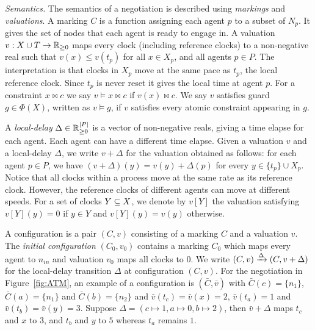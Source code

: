 \smallskip
\noindent \emph{Semantics.} The semantics of a negotiation is described using \emph{markings} and \emph{valuations}.  A marking $C$ is a function assigning each agent $p$ to a subset of $N_p$. It gives the set of nodes that each agent is ready to engage in. A valuation $v: X \cup T \to \mathbb{R}_{\ge 0}$ maps every clock (including reference clocks) to a non-negative real such that $v(x) \le v(t_p)$ for all $x \in X_p$, and all agents $p \in P$. The interpretation is that clocks in $X_p$ move at the same pace as $t_p$, the local reference clock. Since $t_p$ is never reset it gives the local time at agent $p$. For a constraint $x \bowtie c$ we say $v \models x \bowtie c$ if $v(x) \bowtie c$. We say $v$ satisfies guard $g \in \Phi(X)$, written as $v \models g$, if $v$ satisfies every atomic constraint appearing in $g$.

A \emph{local-delay} $\Delta \in \mathbb{R}_{\ge 0}^{|P|}$ is a vector of non-negative reals, giving a time elapse for each agent. Each agent can have a different time elapse.  Given a valuation $v$ and a local-delay $\Delta$, we write $v + \Delta$ for the valuation obtained as follows: for each agent $p \in P$, we have $(v + \Delta)(y) = v(y) + \Delta(p)$ for every $y \in \{t_p\} \cup X_p$. Notice that all clocks within a process move at the same rate as its reference clock. However, the reference clocks of different agents can move at different speeds. For a set of clocks $Y \subseteq X$, we denote by $v[Y]$ the valuation satisfying $v[Y](y) = 0$ if $y \in Y$ and $v[Y](y) = v(y)$ otherwise. 

A configuration is a pair $(C, v)$ consisting of a marking $C$ and a valuation $v$. The \emph{initial configuration} $(C_0, v_0)$ contains a marking $C_0$ which maps every agent to $n_{in}$ and valuation $v_0$ maps all clocks to $0$. We write $(C, v) \xrightarrow{\Delta} (C, v+\Delta)$ for the local-delay transition $\Delta$ at configuration $(C, v)$. For the negotiation in Figure~\ref{fig:ATM}, an example of a configuration is $(\bar{C}, \bar{v})$ with $\bar{C}(c) = \{ n_1 \}$, $\bar{C}(a) = \{n_1\}$ and $\bar{C}(b) = \{n_2\}$ and $\bar{v}(t_c) = \bar{v}(x) = 2$, $\bar{v}(t_a) = 1$ and $\bar{v}(t_b) = \bar{v}(y) = 3$. Suppose $\Delta = (c \mapsto 1, a \mapsto 0, b \mapsto 2)$, then $\bar{v} + \Delta$ maps $t_c$ and $x$ to $3$, and $t_b$ and $y$ to $5$ whereas $t_a$ remains $1$. 

